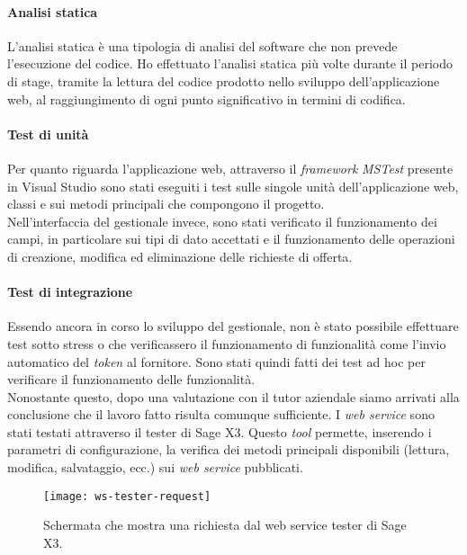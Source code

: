 \paragraph{Analisi statica}
L'analisi statica è una tipologia di analisi del software che non prevede l'esecuzione del codice.
Ho effettuato l'analisi statica più volte durante il periodo di stage, tramite la lettura del codice prodotto nello sviluppo dell'applicazione web, al raggiungimento di ogni punto significativo in termini di codifica.

\paragraph{Test di unità}
Per quanto riguarda l'applicazione web, attraverso il \textit{framework} \textit{MSTest} presente in Visual Studio sono stati eseguiti i test sulle singole unità dell'applicazione web, classi e sui metodi principali che compongono il progetto.\\
Nell'interfaccia del gestionale invece, sono stati verificato il funzionamento dei campi, in particolare sui tipi di dato accettati e il funzionamento delle operazioni di creazione, modifica ed eliminazione delle richieste di offerta.

\paragraph{Test di integrazione}
Essendo ancora in corso lo sviluppo del gestionale, non è stato possibile effettuare test sotto stress o che verificassero il funzionamento di funzionalità come l'invio automatico del \textit{token} al fornitore. Sono stati quindi fatti dei test ad hoc per verificare il funzionamento delle funzionalità.\\
Nonostante questo, dopo una valutazione con il tutor aziendale siamo arrivati alla conclusione che il lavoro fatto risulta comunque sufficiente.
I \textit{web service} sono stati testati attraverso il tester di Sage X3. Questo \textit{tool} permette, inserendo i parametri di configurazione, la verifica dei metodi principali disponibili (lettura, modifica, salvataggio, ecc.) sui \textit{web service} pubblicati.


\begin{figure}[htbp]
	\begin{center}
		\texttt{[image: ws-tester-request]}
		\caption{Schermata che mostra una richiesta dal web service tester di Sage X3.}
	\end{center}
\end{figure}


